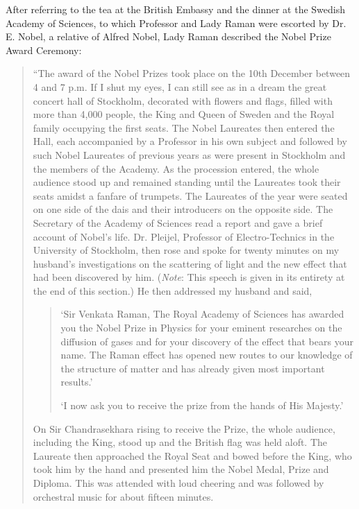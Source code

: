 After referring to the tea at the British Embassy and the
dinner at the Swedish Academy of Sciences, to which Professor
and Lady Raman were escorted by Dr. E. Nobel, a relative of
Alfred Nobel, Lady Raman described the Nobel Prize Award
Ceremony:
\begin{quote}
{\fontsize{10pt}{12pt}\selectfont
``The award of the Nobel Prizes took place on the 10th
December between 4 and 7 p.m. If I shut my eyes, I can still see
as in a dream the great concert hall of Stockholm, decorated with
flowers and flags, filled with more than 4,000 people, the King
and Queen of Sweden and the Royal family occupying the first
seats. The Nobel Laureates then entered the Hall, each
accompanied by a Professor in his own subject and followed by
such Nobel Laureates of previous years as were present in
Stockholm and the members of the Academy. As the procession
entered, the whole audience stood up and remained standing until
the Laureates took their seats amidst a fanfare of trumpets.
The Laureates of the year were seated on one side of the dais and
their introducers on the opposite side. The Secretary of the
Academy of Sciences read a report and gave a brief account of
Nobel's life. Dr. Pleijel, Professor of Electro-Technics in the
University of Stockholm, then rose and spoke for twenty minutes
on my husband's investigations on the scattering of light and the
new effect that had been discovered by him. ({\em Note}: This speech
is given in its entirety at the end of this section.) He then addressed
my husband and said,
\begin{quote}
{\fontsize{10pt}{12pt}\selectfont
`Sir Venkata Raman, The Royal Academy of Sciences
has awar\-ded you the Nobel Prize in Physics for your eminent
researches on the diffusion of gases and for your discovery
of the effect that bears your name. The Raman effect has
opened new routes to our knowledge of the structure of
matter and has already given most important results.'

`I now ask you to receive the prize from the hands of
His Majesty.'}\relax
\end{quote}
On Sir Chandrasekhara rising to receive the Prize, the whole
audience, including the King, stood up and the British flag was
held aloft. The Laureate then approached the Royal Seat and
bowed before the King, who took him by the hand and presented
him the Nobel Medal, Prize and Diploma. This was attended with
loud cheering and was followed by orchestral music for about
fifteen minutes.

}
\end{quote}
